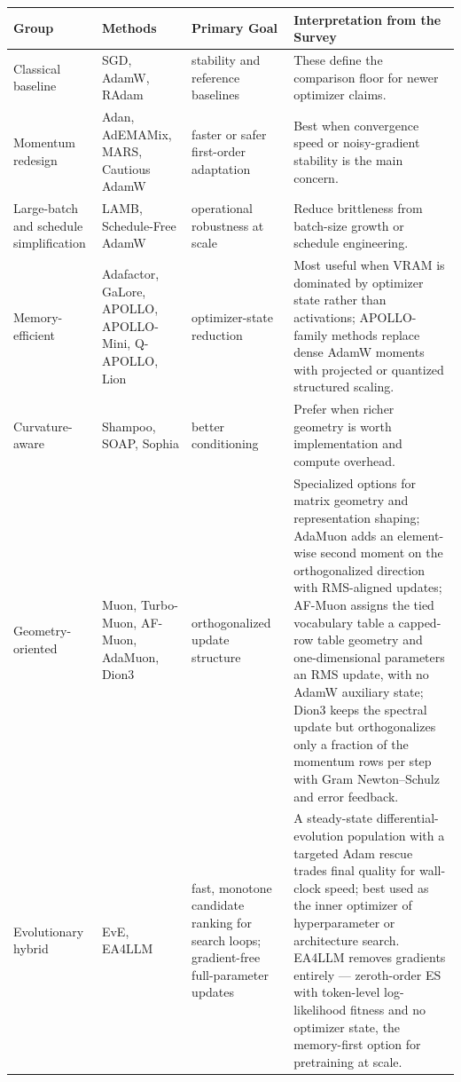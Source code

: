 \small
\begin{longtable}{L{2.5cm}L{3.5cm}L{2.3cm}L{5.0cm}}
\toprule
\textbf{Group} & \textbf{Methods} & \textbf{Primary Goal} & \textbf{Interpretation from the Survey} \\
\midrule
\endhead
Classical baseline & SGD, AdamW, RAdam & stability and reference baselines & These define the comparison floor for newer optimizer claims. \\
Momentum redesign & Adan, AdEMAMix, MARS, Cautious AdamW & faster or safer first-order adaptation & Best when convergence speed or noisy-gradient stability is the main concern. \\
Large-batch and schedule simplification & LAMB, Schedule-Free AdamW & operational robustness at scale & Reduce brittleness from batch-size growth or schedule engineering. \\
Memory-efficient & Adafactor, GaLore, APOLLO, APOLLO-Mini, Q-APOLLO, Lion & optimizer-state reduction & Most useful when VRAM is dominated by optimizer state rather than activations; APOLLO-family methods replace dense AdamW moments with projected or quantized structured scaling. \\
Curvature-aware & Shampoo, SOAP, Sophia & better conditioning & Prefer when richer geometry is worth implementation and compute overhead. \\
Geometry-oriented & Muon, Turbo-Muon, AF-Muon, AdaMuon, Dion3 & orthogonalized update structure & Specialized options for matrix geometry and representation shaping; AdaMuon adds an element-wise second moment on the orthogonalized direction with RMS-aligned updates; AF-Muon assigns the tied vocabulary table a capped-row table geometry and one-dimensional parameters an RMS update, with no AdamW auxiliary state; Dion3 keeps the spectral update but orthogonalizes only a fraction of the momentum rows per step with Gram Newton--Schulz and error feedback. \\
Evolutionary hybrid & EvE, EA4LLM & fast, monotone candidate ranking for search loops; gradient-free full-parameter updates & A steady-state differential-evolution population with a targeted Adam rescue trades final quality for wall-clock speed; best used as the inner optimizer of hyperparameter or architecture search. EA4LLM removes gradients entirely --- zeroth-order ES with token-level log-likelihood fitness and no optimizer state, the memory-first option for pretraining at scale. \\
\bottomrule
\end{longtable}
\normalsize
